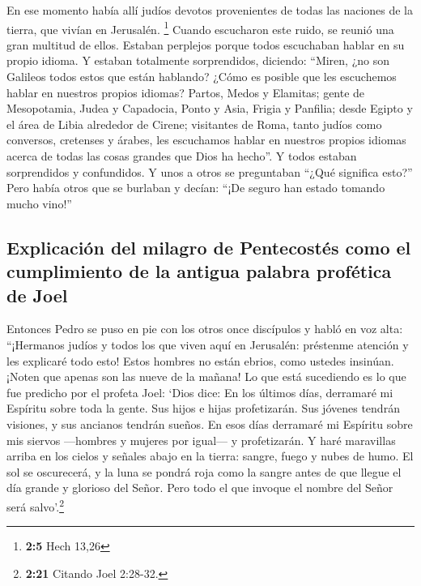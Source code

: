  En ese momento había allí judíos devotos provenientes de
todas las naciones de la tierra, que vivían en Jerusalén. \footnote{\textbf{2:5}
  Hech 13,26}  Cuando escucharon este ruido, se reunió una
gran multitud de ellos. Estaban perplejos porque todos escuchaban hablar
en su propio idioma.  Y estaban totalmente sorprendidos,
diciendo: ``Miren, ¿no son Galileos todos estos que están hablando?
 ¿Cómo es posible que les escuchemos hablar en nuestros
propios idiomas?  Partos, Medos y Elamitas; gente de
Mesopotamia, Judea y Capadocia, Ponto y Asia,  Frigia y
Panfilia; desde Egipto y el área de Libia alrededor de Cirene;
visitantes de Roma, tanto judíos como conversos, 
cretenses y árabes, les escuchamos hablar en nuestros propios idiomas
acerca de todas las cosas grandes que Dios ha hecho''.  Y
todos estaban sorprendidos y confundidos. Y unos a otros se preguntaban
``¿Qué significa esto?''  Pero había otros que se
burlaban y decían: ``¡De seguro han estado tomando mucho vino!''

\hypertarget{explicaciuxf3n-del-milagro-de-pentecostuxe9s-como-el-cumplimiento-de-la-antigua-palabra-profuxe9tica-de-joel}{%
\subsection{Explicación del milagro de Pentecostés como el cumplimiento
de la antigua palabra profética de
Joel}\label{explicaciuxf3n-del-milagro-de-pentecostuxe9s-como-el-cumplimiento-de-la-antigua-palabra-profuxe9tica-de-joel}}

 Entonces Pedro se puso en pie con los otros once
discípulos y habló en voz alta: ``¡Hermanos judíos y todos los que viven
aquí en Jerusalén: préstenme atención y les explicaré todo esto!
 Estos hombres no están ebrios, como ustedes insinúan.
¡Noten que apenas son las nueve de la mañana!  Lo que
está sucediendo es lo que fue predicho por el profeta Joel:
 `Dios dice: En los últimos días, derramaré mi Espíritu
sobre toda la gente. Sus hijos e hijas profetizarán. Sus jóvenes tendrán
visiones, y sus ancianos tendrán sueños.  En esos días
derramaré mi Espíritu sobre mis siervos ---hombres y mujeres por
igual--- y profetizarán.  Y haré maravillas arriba en los
cielos y señales abajo en la tierra: sangre, fuego y nubes de humo.
 El sol se oscurecerá, y la luna se pondrá roja como la
sangre antes de que llegue el día grande y glorioso del Señor.
 Pero todo el que invoque el nombre del Señor será
salvo'.\footnote{\textbf{2:21} Citando Joel 2:28-32.}

